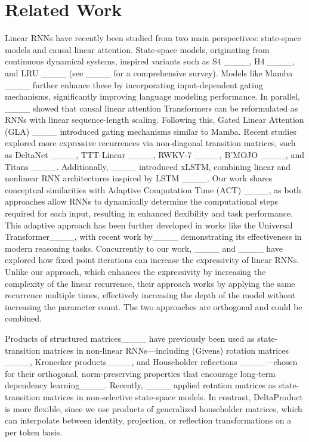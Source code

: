 \section{Related Work}
\label{sec:related_work}
\vspace{-2mm}
Linear RNNs have recently been studied from two main perspectives: state-space models and causal linear attention. State-space models, originating from continuous dynamical systems, inspired variants such as S4 ____, H4 ____, and LRU ____ (see ____ for a comprehensive survey). Models like Mamba ____ further enhance these by incorporating input-dependent gating mechanisms, significantly improving language modeling performance.
In parallel, ____ showed that causal linear attention Transformers can be reformulated as RNNs with linear sequence-length scaling. Following this, Gated Linear Attention (GLA) ____ introduced gating mechanisms similar to Mamba. Recent studies explored more expressive recurrences via non-diagonal transition matrices, such as DeltaNet ____, TTT-Linear ____, RWKV-7 ____, B'MOJO ____, and Titans ____. Additionally, ____ introduced xLSTM, combining linear and nonlinear RNN architectures inspired by LSTM ____.
Our work shares conceptual similarities with Adaptive Computation Time (ACT) ____, as both approaches allow RNNs to dynamically determine the computational steps required for each input, resulting in enhanced flexibility and task performance. 
This adaptive approach has been further developed in works like the Universal Transformer____, with recent work by____ demonstrating its effectiveness in modern reasoning tasks. Concurrently to our work, ____ and ____ have explored how fixed point iterations can increase the expressivity of linear RNNs. Unlike our approach, which enhances the expressivity by increasing the complexity of the linear recurrence, their approach works by applying the same recurrence multiple times, effectively increasing the depth of the model without increasing the parameter count. The two approaches are orthogonal and could be combined.

Products of structured matrices____ have previously been used as state-transition matrices in non-linear RNNs—including (Givens) rotation matrices ____, Kronecker products____, and Householder reflections ____—chosen for their orthogonal, norm-preserving properties that encourage long-term dependency learning____. Recently, ____ applied rotation matrices as state-transition matrices in non-selective state-space models. In contrast, DeltaProduct is more flexible, since we use products of generalized householder matrices, which can interpolate between identity, projection, or reflection transformations on a per token basis.